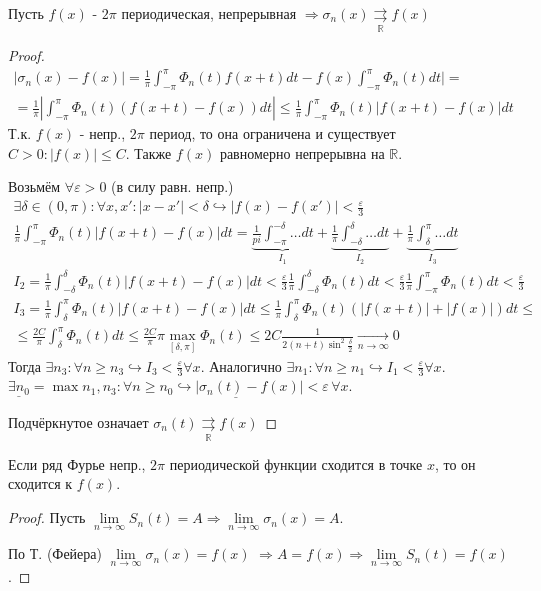 \documentclass{article}
\theoremstyle{definition}
\numberwithin{theorem}{section}
\numberwithin{lemma}{section}
\numberwithin{definition}{section}
\numberwithin{corollary}{section}
\numberwithin{equation}{section}
\let\epsilon\varepsilon
\let\implies\Rightarrow
\let\true\hookrightarrow
\newcommand\R{\ensuremath{\mathbb{R}}}
\begin{document}
\begin{theorem}[Фейера]
  Пусть $f(x)$ - $2\pi$ периодическая, непрерывная
  $\implies \sigma_n(x) \underset{\R}{\rightrightarrows} f(x)$
\end{theorem}
\begin{proof}
  \begin{gather*}
    |\sigma_n(x)-f(x)|=\frac{1}{\pi}\int_{-\pi}^{\pi}\Phi_n(t)f(x+t)dt-f(x)\int_{-\pi}^{\pi}\Phi_n(t)dt| = \\ 
  = \frac{1}{\pi}|\int_{-\pi}^{\pi}\Phi_n(t)(f(x+t)-f(x))dt|
  \le \frac{1}{\pi}\int_{-\pi}^{\pi}\Phi_n(t)|f(x+t)-f(x)|dt
  \end{gather*}
  Т.к. $f(x)$ - непр., $2\pi$ период, то она ограничена и существует $C>0:|f(x)|\le C$.
  Также $f(x)$ равномерно непрерывна на $\R$.
  
  Возьмём $\forall \epsilon>0$ (в силу равн. непр.) 
  \begin{gather*}
    \exists \delta \in (0,\pi): \forall x, x':|x-x'|<\delta \true |f(x)-f(x')|<\frac{\epsilon}{3} \\ 
    \frac{1}{\pi}\int_{-\pi}^{\pi}\Phi_n(t)|f(x+t)-f(x)|dt=\underbrace{\frac{1}{pi}\int_{-\pi}^{-\delta}\dots dt}_{I_1} + \underbrace{\frac{1}{\pi}\int_{-\delta}^{\delta}\dots dt}_{I_2} + \underbrace{\frac{1}{\pi}\int_{\delta}^{\pi}\dots dt}_{I_3} \\ 
    I_2= \frac{1}{\pi}\int_{-\delta}^{\delta}\Phi_n(t)|f(x+t)-f(x)|dt < \frac{\epsilon}{3}\frac{1}{\pi}\int_{-\delta}^{\delta}\Phi_n(t)dt 
    < \frac{\epsilon}{3}\frac{1}{\pi}\int_{-\pi}^{\pi}\Phi_n(t)dt < \frac{\epsilon}{3} \\ 
    I_3=\frac{1}{\pi}\int_{\delta}^{\pi}\Phi_n(t)|f(x+t)-f(x)|dt \le 
    \frac{1}{\pi}\int_{\delta}^{\pi}\Phi_n(t)(|f(x+t)|+|f(x)|)dt \le  \\
    \le \frac{2C}{\pi}\int_{\delta}^{\pi}\Phi_n(t)dt \le
    \frac{2C}{\pi}\pi \max \limits_{[\delta,\pi]} \Phi_n(t) \le 
    2C\frac{1}{2(n+t)\sin^{2}\frac{\delta}{2}} \underset{n\to\infty}{\to}0
  \end{gather*}
  Тогда $\exists n_3: \forall n \ge n_3 \true I_3<\frac{\epsilon}{3} \forall x$.
  Аналогично $\exists n_1: \forall n \ge n_1 \true I_1<\frac{\epsilon}{3} \forall x$.
  $\underline{\exists n_0}=\max{n_1,n_3}: \underline{\forall n \ge n_0 \true |\sigma_n(t)-f(x)|<\epsilon \, \forall x}$.

  Подчёркнутое означает $\sigma_n(t)\underset{\R}{\rightrightarrows}f(x)$
\end{proof}
\begin{corollary}
  Если ряд Фурье непр., $2\pi$ периодической функции сходится в точке $x$,
  то он сходится к $f(x)$.
\end{corollary}
\begin{proof}
  Пусть $\lim \limits_{n\to\infty} S_n(t)=A \implies \lim \limits_{n\to\infty}\sigma_n(x)=A$.

  По Т. (Фейера) $\lim\limits_{n\to\infty}\sigma_n(x)=f(x)$
  $\implies A=f(x) \implies \lim\limits_{n\to\infty}S_n(t)=f(x)$.
\end{proof}
\end{document}
